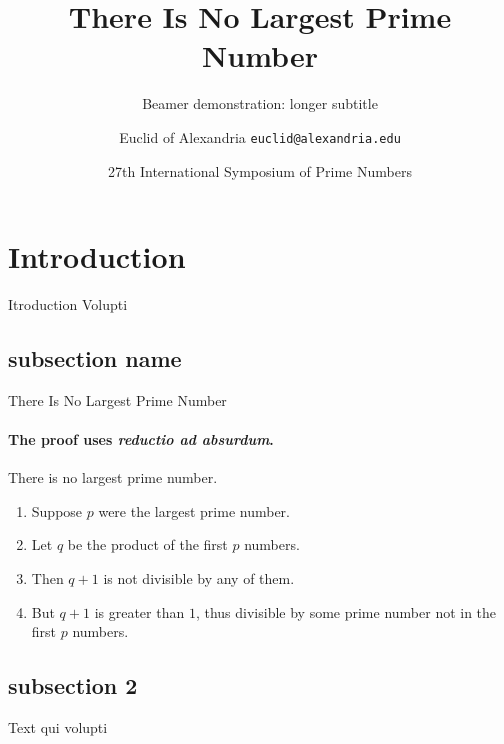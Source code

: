 \documentclass{beamer}
\title{There Is No Largest Prime Number}
\subtitle{Beamer demonstration: longer subtitle}
\institute{IGN}
\date[ISPN ’80]{27th International Symposium of Prime Numbers}
\author[Euclid]{Euclid of Alexandria \texttt{euclid@alexandria.edu}}
\begin{document}
    \begin{frame}
        \titlepage{}
    \end{frame}

    \section{Introduction}
        \begin{frame}{Itroduction}
            Volupti
        \end{frame}
        \subsection{subsection name}
            \begin{frame}{There Is No Largest Prime Number}
                \framesubtitle{The proof uses \textit{reductio ad absurdum}.}
                \begin{theorem}
                    There is no largest prime number. \end{theorem}
                \begin{enumerate}
                    \item<1-| alert@1> Suppose $p$ were the largest prime number.
                    \item<2-> Let $q$ be the product of the first $p$ numbers.
                    \item<3-> Then $q+1$ is not divisible by any of them.
                    \item<1-> But $q + 1$ is greater than $1$, thus divisible by some prime
                    number not in the first $p$ numbers.
                \end{enumerate}
            \end{frame}
        \subsection{subsection 2}
        \begin{frame}
            Text qui volupti
        \end{frame}
\end{document}
